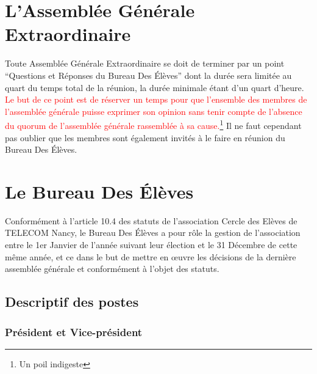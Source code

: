 \documentclass{article} %
\begin{document}
	\section{L'Assemblée Générale Extraordinaire}

		Toute Assemblée Générale Extraordinaire se doit de terminer par un point
		“Questions et Réponses du Bureau Des Élèves” dont la durée sera limitée
		au quart du temps total de la réunion, la durée minimale étant d’un
		quart d’heure. \textcolor{red}{Le but de ce point est de réserver un
		temps pour que l’ensemble des membres de l’assemblée générale puisse
		exprimer son opinion sans tenir compte de l’absence du quorum de
		l’assemblée générale rassemblée à sa cause.}\footnote{Un poil indigeste}
		Il ne faut cependant pas oublier que les membres sont également invités
		à le faire en réunion du Bureau Des Élèves.

	\section{Le Bureau Des Élèves}

			Conformément à l’article 10.4 des statuts de l’association Cercle
			des Elèves de TELECOM Nancy, le Bureau Des Élèves a pour rôle la
			gestion de l'association entre le 1er Janvier de l’année suivant
			leur élection et le 31 Décembre de cette même année, et ce dans le
			but de mettre en œuvre les décisions de la dernière assemblée
			générale et conformément à l'objet des statuts.

		\subsection{Descriptif des postes}

			\subsubsection{Président et Vice-président}
\end{document}
